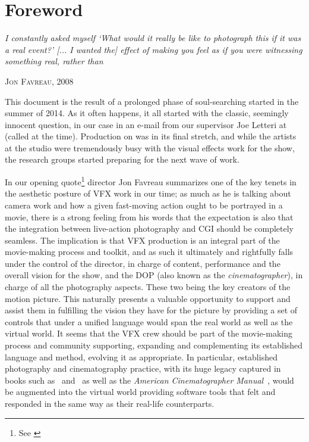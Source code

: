 
\chapter*{Foreword}\label{ch:foreword}

\epigraph{%
	\emph{I constantly asked myself `What would it really be like to photograph
		this if it was a real event?' [... I wanted the] effect of making you feel
		as if you were witnessing something real, rather than }}
{\textsc{Jon Favreau}, 2008}

\noindent This document is the result of a prolonged phase of soul-searching 
started in the summer of 2014. As it often happens, it all started with the classic,
seemingly innocent question, in our case in an e-mail from our supervisor Joe Letteri
at  (called  at the time).
Production on \cite{hobbit3} was in its final stretch, and while the artists at the studio
were tremendously busy with the visual effects work for the show, the research groups
started preparing for the next wave of work. 

In our opening quote\footnote{See \cite{duncan08}} director Jon Favreau summarizes one of the key 
tenets in the aesthetic posture of \gls{VFX} work in our time; as much as he is talking
about camera work and how a given fast-moving action ought to be portrayed in a movie, 
there is a strong feeling from his words that the expectation is also that the integration between 
live-action photography and \gls{CGI} should be completely seamless.
The implication is that \gls{VFX} production is an integral part of the movie-making process and toolkit, 
and as such it ultimately and rightfully falls under the control of the director, in charge of content, 
performance and the overall vision for the show, and the \gls{DOP} (also known as 
the \textsl{cinematographer}), in charge of all the photography aspects. 
These two being the key creators of the motion picture. 
This naturally presents a valuable opportunity to support and assist them in fulfilling the vision
they have for the picture by providing a set of controls that under a unified language would span the 
real world as well as the \gls{virtual} world.
It seems that the \gls{VFX} crew should be part of the movie-making process and community supporting,
expanding and complementing its established language and method, evolving it as appropriate.
In particular, established photography and cinematography practice, with its huge 
legacy captured in books such as~\cite{alton1995} and~\cite{lowell1992} as well as
the \emph{American Cinematographer Manual}~\cite{burum2007}, would be augmented into the \gls{virtual} world
providing software tools that felt and responded in the same way as their real-life counterparts.

